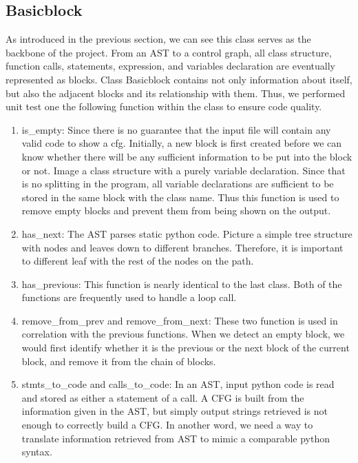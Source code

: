 \documentclass[11pt]{article}
\begin{document}
\subsection{Basicblock}
As introduced in the previous section, we can see this class serves as the backbone of the project. From an AST to a control graph, all class structure, function calls, statements, expression, and variables declaration are eventually represented as blocks. Class Basicblock contains not only information about itself, but also the adjacent blocks and its relationship with them. Thus, we performed unit test one the following function within the class to ensure code quality.
\begin{enumerate}
\item is\_empty: Since there is no guarantee that the input file will contain any valid code to show a cfg. Initially, a new block is first created before we can know whether there will be any sufficient information to be put into the block or not. Image a class structure with a purely variable declaration. Since that is no splitting in the program, all variable declarations are sufficient to be stored in the same block with the class name. Thus this function is used to remove empty blocks and prevent them from being shown on the output.
\item has\_next: The AST parses static python code. Picture a simple tree structure with nodes and leaves down to different branches. Therefore, it is important to different leaf with the rest of the nodes on the path.
\item has\_previous: This function is nearly identical to the last class. Both of the functions are frequently used to handle a loop call.
\item remove\_from\_prev and remove\_from\_next: These two function is used in correlation with the previous functions. When we detect an empty block, we would first identify whether it is the previous or the next block of the current block, and remove it from the chain of blocks.
\item stmts\_to\_code and calls\_to\_code: In an AST, input python code is read and stored as either a statement of a call. A CFG is built from the information given in the AST, but simply output strings retrieved is not enough to correctly build a CFG. In another word, we need a way to translate information retrieved from AST to mimic a comparable python syntax. \\
\end{enumerate}
\end{document}

